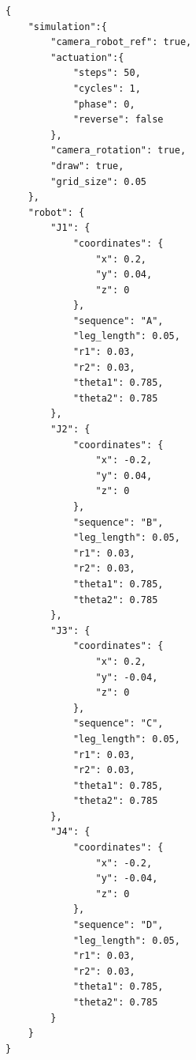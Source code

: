 \begin{lstlisting}
{
    "simulation":{
        "camera_robot_ref": true,
        "actuation":{
            "steps": 50,
            "cycles": 1,
            "phase": 0,
            "reverse": false
        },
        "camera_rotation": true,
        "draw": true,
        "grid_size": 0.05
    },
    "robot": {
        "J1": {
            "coordinates": {
                "x": 0.2,
                "y": 0.04,
                "z": 0
            },
            "sequence": "A",
            "leg_length": 0.05,
            "r1": 0.03,
            "r2": 0.03,
            "theta1": 0.785,
            "theta2": 0.785
        },
        "J2": {
            "coordinates": {
                "x": -0.2,
                "y": 0.04,
                "z": 0
            },
            "sequence": "B",
            "leg_length": 0.05,
            "r1": 0.03,
            "r2": 0.03,
            "theta1": 0.785,
            "theta2": 0.785
        },
        "J3": {
            "coordinates": {
                "x": 0.2,
                "y": -0.04,
                "z": 0
            },
            "sequence": "C",
            "leg_length": 0.05,
            "r1": 0.03,
            "r2": 0.03,
            "theta1": 0.785,
            "theta2": 0.785
        },
        "J4": {
            "coordinates": {
                "x": -0.2,
                "y": -0.04,
                "z": 0
            },
            "sequence": "D",
            "leg_length": 0.05,
            "r1": 0.03,
            "r2": 0.03,
            "theta1": 0.785,
            "theta2": 0.785
        }
    }
}
\end{lstlisting}
\clearpage
